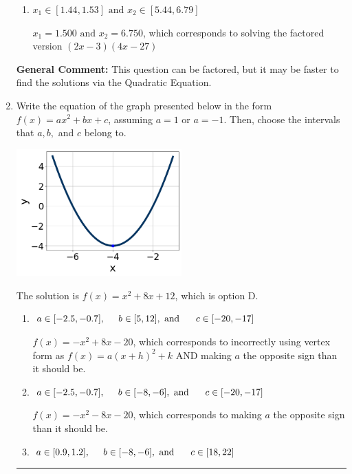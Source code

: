 \documentclass{extbook}[14pt]
\newcommand{\litem}[1]{\item #1

\rule{\textwidth}{0.4pt}}
\begin{document}
\begin{enumerate}
{\begin{enumerate}[label=\Alph*.]
* $x_1 = 2.250 \text{ and } x_2 = 4.500$, which is the correct option. Obtained by solving the factored version $(4x -9)(2x -9)$
\item \( x_1 \in [1.44, 1.53] \text{ and } x_2 \in [5.44, 6.79] \)

$x_1 = 1.500 \text{ and } x_2 = 6.750$, which corresponds to solving the factored version $(2x -3)(4x -27)$
\end{enumerate}

\textbf{General Comment:} This question can be factored, but it may be faster to find the solutions via the Quadratic Equation.
}
\litem{
Write the equation of the graph presented below in the form $f(x)=ax^2+bx+c$, assuming  $a=1$ or $a=-1$. Then, choose the intervals that $a, b,$ and $c$ belong to.

\begin{center}
    \includegraphics[width=0.5\textwidth]{../Figures/quadraticGraphToEquationCopyC.png}
\end{center}


The solution is \( f(x) = x^{2} +8 x + 12 \), which is option D.\begin{enumerate}[label=\Alph*.]
\item \( a \in [-2.5, -0.7], \hspace*{5mm} b \in [5, 12], \text{ and } \hspace*{5mm} c \in [-20, -17] \)

$f(x)=-x^{2} +8 x -20$, which corresponds to incorrectly using vertex form as $f(x) = a(x+h)^2+k$ AND making $a$ the opposite sign than it should be.
\item \( a \in [-2.5, -0.7], \hspace*{5mm} b \in [-8, -6], \text{ and } \hspace*{5mm} c \in [-20, -17] \)

$f(x)=-x^{2} -8 x -20$, which corresponds to making $a$ the opposite sign than it should be.
\item \( a \in [0.9, 1.2], \hspace*{5mm} b \in [-8, -6], \text{ and } \hspace*{5mm} c \in [18, 22] \)


\end{enumerate}}
\end{enumerate}
\end{document}
